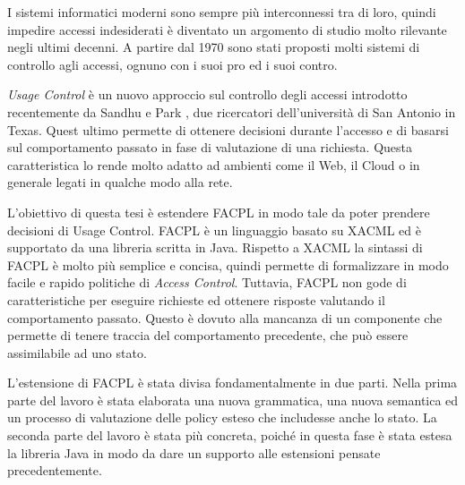 I sistemi informatici moderni sono sempre più interconnessi tra di loro, quindi
impedire accessi indesiderati è diventato un argomento di studio molto rilevante negli ultimi decenni.
A partire dal 1970 sono stati proposti molti sistemi di controllo agli accessi, ognuno con i suoi pro ed i suoi contro.\par
\textit{Usage Control} è un nuovo approccio sul controllo degli accessi
introdotto recentemente da Sandhu e Park \cite{ucon}, due ricercatori dell'università di San Antonio in Texas.
Quest ultimo permette di ottenere decisioni durante
l’accesso e di basarsi sul comportamento passato in fase di valutazione
di una richiesta. Questa caratteristica lo rende molto adatto ad ambienti come il Web,
il Cloud o in generale legati in qualche modo alla rete. \par
L'obiettivo di questa tesi è estendere \ac{FACPL} in modo tale da poter prendere decisioni 
di Usage Control.
\ac{FACPL} è un linguaggio basato su \ac{XACML} ed è supportato da una libreria
scritta in Java. Rispetto a \ac{XACML} la sintassi di \ac{FACPL} è molto più semplice
e concisa, quindi permette di formalizzare in modo facile e rapido
politiche di \textit{Access Control}. 
Tuttavia, \ac{FACPL} non gode di caratteristiche
per eseguire richieste ed ottenere risposte valutando il comportamento passato. Questo è dovuto alla mancanza di un componente che permette di tenere traccia del comportamento precedente, che può essere assimilabile ad uno stato.\par
L'estensione di \ac{FACPL} è stata divisa fondamentalmente in due parti. 
Nella prima parte del lavoro è stata elaborata una nuova grammatica, una nuova semantica ed un processo di valutazione delle policy esteso che includesse anche lo stato.
La seconda parte del lavoro è stata più concreta, poiché in questa fase è stata estesa la libreria Java in modo da dare un supporto alle estensioni pensate precedentemente. \par



